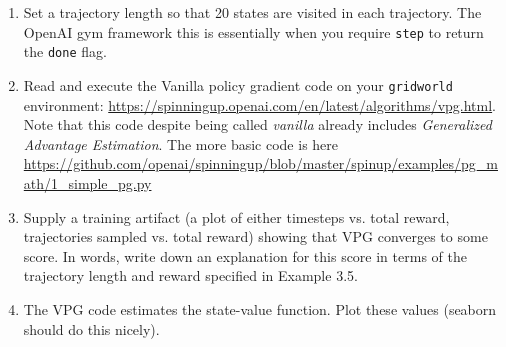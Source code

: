 \documentclass{article}
\begin{document}
\begin{enumerate}
  \begin{enumerate}
  \item Set a trajectory length so that 20 states are visited in each
    trajectory. The OpenAI gym framework this is essentially when you require {\tt step} to return the {\tt done} flag.
  \item Read and execute the Vanilla policy gradient code on your {\tt gridworld} environment: \url{https://spinningup.openai.com/en/latest/algorithms/vpg.html}. Note
    that this code despite being called {\em vanilla} already includes {\em Generalized Advantage Estimation}. The more basic code is here \url{https://github.com/openai/spinningup/blob/master/spinup/examples/pg_math/1_simple_pg.py}
  \item Supply a training artifact (a plot of either timesteps vs. total reward, trajectories sampled vs. total reward) showing that VPG converges to some score. In words, write down an explanation
    for this score in terms of the trajectory length and reward specified in Example 3.5.
  \item The VPG code estimates the state-value function. Plot these values (seaborn should do this nicely).
  \end{enumerate}
\end{enumerate}
\end{document}
